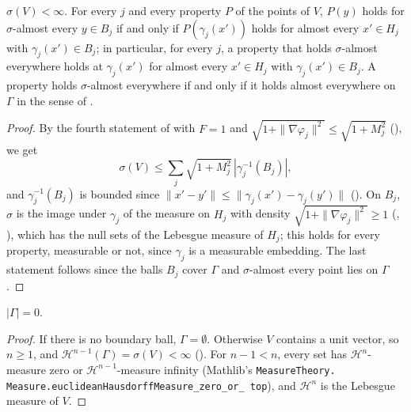 \begin{theorem}
\label{thm:surface-measure-null-sets}
\leanok
{}
$\sigma(V) < \infty$. For every $j$ and every property $P$ of the points of $V$, $P(y)$ holds for
$\sigma$-almost every $y \in B_j$ if and only if $P(\gamma_j(x'))$ holds for almost every
$x' \in H_j$ with $\gamma_j(x') \in B_j$; in particular, for every $j$, a property that holds
$\sigma$-almost everywhere holds at $\gamma_j(x')$ for almost every $x' \in H_j$ with
$\gamma_j(x') \in B_j$. A property holds $\sigma$-almost everywhere if and only if it holds
almost everywhere on $\Gamma$ in the sense of .
\end{theorem}

\begin{proof}
\leanok
By the fourth statement of  with $F = 1$ and
$\sqrt{1 + \|\nabla\varphi_j\|^2} \leq \sqrt{1 + M_j^2}$ (), we get
\[
  \sigma(V) \leq \sum_j \sqrt{1 + M_j^2} \, |\gamma_j^{-1}(B_j)| ,
\]
and $\gamma_j^{-1}(B_j)$ is
bounded since $\|x' - y'\| \leq \|\gamma_j(x') - \gamma_j(y')\|$ (). On
$B_j$, $\sigma$ is the image under $\gamma_j$ of the measure on $H_j$ with density
$\sqrt{1 + \|\nabla\varphi_j\|^2} \geq 1$ (,
), which has the null sets of the Lebesgue measure of $H_j$;
this holds for every property, measurable or not, since $\gamma_j$ is a measurable embedding. The
last statement follows since the balls $B_j$ cover $\Gamma$ and $\sigma$-almost every point lies
on $\Gamma$.
\end{proof}

\begin{corollary}
\label{cor:boundary-null}
\leanok
{}
$|\Gamma| = 0$.
\end{corollary}

\begin{proof}
\leanok
If there is no boundary ball, $\Gamma = \emptyset$. Otherwise $V$ contains a unit vector, so
$n \geq 1$, and $\mathcal H^{n-1}(\Gamma) = \sigma(V) < \infty$
(). For $n - 1 < n$, every set has $\mathcal H^n$-measure
zero or $\mathcal H^{n-1}$-measure infinity (Mathlib's \texttt{MeasureTheory.\allowbreak
Measure.\allowbreak euclideanHausdorffMeasure\_\allowbreak zero\_\allowbreak or\_\allowbreak
top}), and $\mathcal H^n$ is the Lebesgue measure of $V$.
\end{proof}

